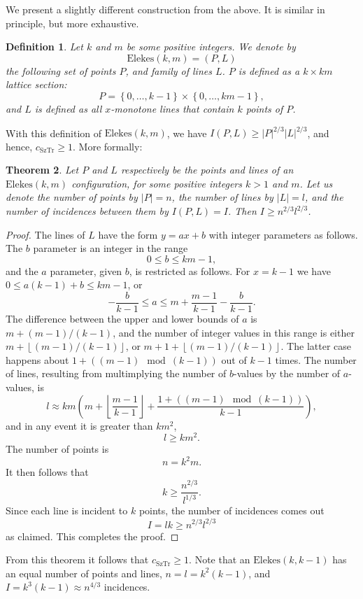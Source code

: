 \documentclass[11pt]{article}
\newtheorem{theorem}{Theorem}[section]
\newtheorem{definition}[theorem]{Definition}
\newcommand\set[1]{\left\{ #1 \right\}}
\newcommand\floor[1]{\left\lfloor #1 \right\rfloor}
\newcommand\cst{c_{\mathrm{SzTr}}}
\newcommand\Elekes{\mathrm{Elekes}}
\begin{document}
We present a slightly different construction from the above.
It is similar in principle, but more exhaustive.
\begin{definition}
Let $k$ and $m$ be some positive integers.
We denote by
$$\Elekes(k,m) = (P,L)$$
the following set of points $P$, and family of lines $L$.
$P$ is defined as a $k \times km$ lattice section:
\[
P = \set{0, \ldots, k-1} \times \set{0, \ldots, km-1},
\]
and $L$ is defined as all $x$-monotone lines that contain $k$ points of $P$.
\end{definition}
With this definition of $\Elekes(k,m)$, we have $I(P,L) \ge |P|^{2/3}|L|^{2/3}$,
and hence, $\cst \ge 1$. More formally:
%
\begin{theorem}
Let $P$ and $L$ respectively be the points and lines of an $\Elekes(k,m)$
configuration, for some positive integers $k>1$ and $m$.
Let us denote the number of points by $|P| = n$, the number of lines by
$|L| = l$, and the number of incidences between them by $I(P,L) = I$.
Then $I \ge n^{2/3}l^{2/3}$.
\end{theorem}
%
\begin{proof}
The lines of $L$ have the form $y = ax + b$ with integer parameters as follows.
The $b$ parameter is an integer in the range
\[
0 \le b \le km-1,
\]
and the $a$ parameter, given $b$, is restricted as follows.
For $x=k-1$ we have $0 \le a(k-1) + b \le km-1$, or
\[
-\frac{b}{k-1} \le a \le m + \frac{m-1}{k-1} - \frac{b}{k-1}.
\]
The difference between the upper and lower bounds of $a$ is $m + (m-1)/(k-1)$,
and the number of integer values in this range is either
$m + \floor{(m-1)/(k-1)}$, or $m + 1 + \floor{(m-1)/(k-1)}$.
The latter case happens about $1 + ((m-1) \mod (k-1))$ out of $k-1$ times.
The number of lines, resulting from multimplying the number of $b$-values by the
number of $a$-values, is
\[
l \approx km \left(m + \floor{\frac{m-1}{k-1}}
				+ \frac{1 + ((m-1) \mod (k-1))}{k-1}\right),
\]
and in any event it is greater than $km^2$,
\[
l \ge km^2.
\]
The number of points is
\[
n = k^2m.
\]
It then follows that
\[
k \ge \frac{n^{2/3}}{l^{1/3}}.
\]
Since each line is incident to $k$ points, the number of incidences comes out
\[
I = lk \ge n^{2/3}l^{2/3}
\]
as claimed. This completes the proof.
\end{proof}
%
From this theorem it follows that $\cst \ge 1$.
Note that an $\Elekes(k,k-1)$ has an equal number of points and lines,
$n = l = k^2(k-1)$, and $I = k^3(k-1) \approx n^{4/3}$ incidences.
\end{document}
